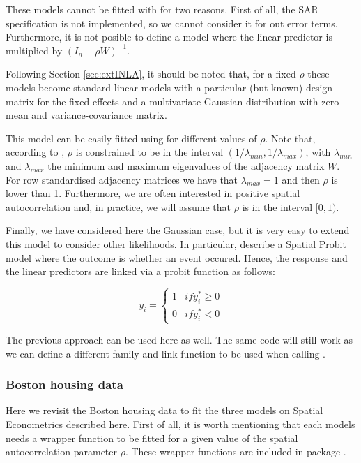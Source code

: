 \documentclass[article]{jss}
\begin{document}
These models cannot be fitted with  for two reasons. First of all, 
the SAR specification is not implemented, so we cannot consider it for out
error terms. Furthermore, it is not posible to define a model 
where the linear predictor is multiplied by $(I_n-\rho W)^{-1}$.

Following Section \ref{sec:extINLA}, it should be noted that, for a fixed
$\rho$ these models become standard linear models with a particular 
(but known) design matrix for the fixed effects and a multivariate Gaussian
distribution with zero mean and variance-covariance matrix.

This model can be easily fitted using  for different values
of $\rho$. Note that, according to \citet{Haining:2003}, $\rho$ is constrained 
to be in the interval $(1/\lambda_{min}, 1/\lambda_{max})$, with
$\lambda_{min}$ and $\lambda_{max}$ the minimum and maximum eigenvalues of
the adjacency matrix $W$. For row standardised adjacency matrices we have that
$\lambda_{max}=1$ and then $\rho$ is lower than 1. Furthermore, we are often
interested in positive spatial autocorrelation and, in practice, we will
assume that $\rho$ is in the interval $[0,1)$.


Finally, we have considered here the Gaussian case, but it is very easy to
extend this model to consider other likelihoods. In particular,
\citet{LeSageetal:2011} describe a Spatial Probit model where the outcome is
whether an event occured. Hence, the response and the linear predictors are
linked via a probit function as follows:

$$
y_i=
\left\{
\begin{array}{cc}
1 & if y^*_i\geq 0\\
0 & if y^*_i < 0
\end{array}
\right.
$$

The previous approach can be used here as well. The same code will still work
as we can define a different family and link function to be used when calling
.

\subsubsection{Boston housing data}

Here we revisit the Boston housing data to fit the three models on Spatial
Econometrics described here. First of all, it is worth mentioning that each
models needs a wrapper function to be fitted for a given value of the
spatial autocorrelation parameter $\rho$. These wrapper functions are
included in  package .
\end{document}

